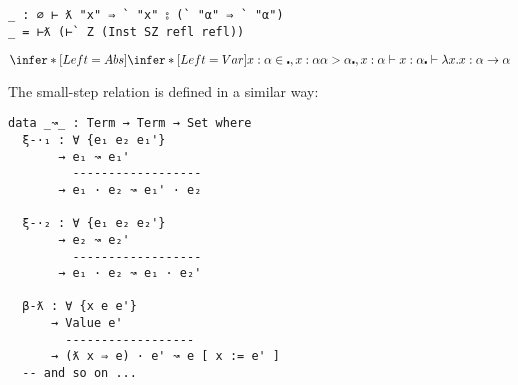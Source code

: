\begin{listing}[H]
  \centering
  \begin{minipage}{0.6\linewidth}
    \begin{verbatim}
_ : ∅ ⊢ ƛ "x" ⇒ ` "x" ⦂ (` "α" ⇒ ` "α")
_ = ⊢ƛ (⊢` Z (Inst SZ refl refl))
    \end{verbatim}
  \end{minipage}%
  \begin{minipage}{0.4\linewidth}
    \[
      \infer*[Left=Abs]{
        \infer*[Left=Var]{
          x : \alpha \in \centerdot, x : \alpha \\
          \alpha > \alpha
        }{
          \centerdot , x : \alpha \vdash x : \alpha
        }
      }
      {\centerdot \vdash \lambda x . x : \alpha \rightarrow \alpha}
    \]
  \end{minipage}
\end{listing}
The small-step relation is defined in a similar way:
\begin{verbatim}
data _↝_ : Term → Term → Set where
  ξ-·₁ : ∀ {e₁ e₂ e₁'}
       → e₁ ↝ e₁'
         ------------------
       → e₁ · e₂ ↝ e₁' · e₂
       
  ξ-·₂ : ∀ {e₁ e₂ e₂'}
       → e₂ ↝ e₂'
         ------------------
       → e₁ · e₂ ↝ e₁ · e₂'

  β-ƛ : ∀ {x e e'}
      → Value e'
        ------------------
      → (ƛ x ⇒ e) · e' ↝ e [ x := e' ]
  -- and so on ...
\end{verbatim}


